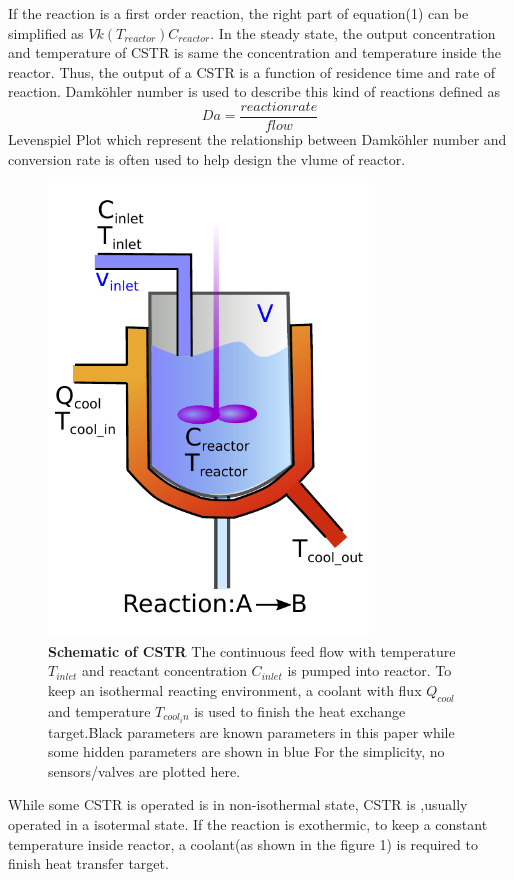 \documentclass[fleqn,11pt]{wlscirep}
\begin{document}
If the reaction is a first order reaction, the right part of equation(1) can be simplified as $Vk(T_{reactor})C_{reactor}$. In the steady state,  the output concentration and temperature of CSTR is same the concentration and temperature inside the reactor. Thus, the output of a CSTR is  a function of residence time and rate of reaction. Damköhler number is used to describe this kind of reactions defined as
\begin{equation}
    Da=\frac{reaction rate}{flow}
\end{equation}
 Levenspiel Plot which represent the relationship between  Damköhler number and conversion rate  is often used to help design the vlume of reactor\cite{fogler2010essentials}.
\begin{figure}[h]
    \centering
    \includegraphics[width=8.5cm]{CSTR.pdf}
    \caption{
    \textbf{Schematic of CSTR } The continuous feed flow with temperature $T_{inlet}$ and reactant concentration $C_{inlet}$ is pumped into reactor. To keep an isothermal reacting environment, a coolant with flux $Q_{cool}$ and temperature $T_{cool_in} $ is used to finish the heat exchange target.Black parameters are known parameters in this paper while some hidden parameters  are shown in blue For the simplicity, no sensors/valves are plotted here.}
    \label{fig:1}
\end{figure}

While some CSTR is operated is in non-isothermal state\cite{bruns1977nonlinear}, CSTR is ,usually operated in a isotermal state\cite{balakotaiah1981analysis}. If the reaction is exothermic, to keep a constant temperature inside reactor, a coolant(as shown in the figure 1) is required to finish heat transfer target.
\end{document}
